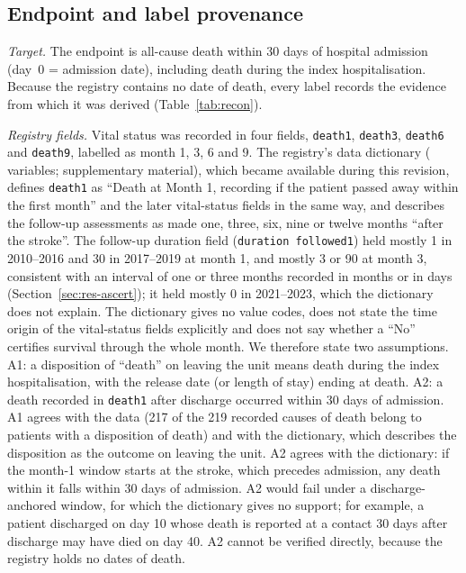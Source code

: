 \documentclass[preprint,10pt]{elsarticle}
\begin{document}
\subsection{Endpoint and label provenance}
\label{sec:outcome}
\emph{Target.} The endpoint is all-cause death within 30 days of hospital admission (day~0 = admission date), including death during the index hospitalisation. Because the registry contains no date of death, every label records the evidence from which it was derived (Table~\ref{tab:recon}).

\emph{Registry fields.} Vital status was recorded in four fields, \texttt{death1}, \texttt{death3}, \texttt{death6} and \texttt{death9}, labelled as month 1, 3, 6 and 9. The registry's data dictionary (\DictRows{} variables; supplementary material), which became available during this revision, defines \texttt{death1} as ``Death at Month 1, recording if the patient passed away within the first month'' and the later vital-status fields in the same way, and describes the follow-up assessments as made one, three, six, nine or twelve months ``after the stroke''. The follow-up duration field (\texttt{duration followed1}) held mostly 1 in 2010--2016 and 30 in 2017--2019 at month 1, and mostly 3 or 90 at month 3, consistent with an interval of one or three months recorded in months or in days (Section~\ref{sec:res-ascert}); it held mostly 0 in 2021--2023, which the dictionary does not explain. The dictionary gives no value codes, does not state the time origin of the vital-status fields explicitly and does not say whether a ``No'' certifies survival through the whole month. We therefore state two assumptions. A1: a disposition of ``death'' on leaving the unit means death during the index hospitalisation, with the release date (or length of stay) ending at death. A2: a death recorded in \texttt{death1} after discharge occurred within 30 days of admission. A1 agrees with the data (217 of the 219 recorded causes of death belong to patients with a disposition of death) and with the dictionary, which describes the disposition as the outcome on leaving the unit. A2 agrees with the dictionary: if the month-1 window starts at the stroke, which precedes admission, any death within it falls within 30 days of admission. A2 would fail under a discharge-anchored window, for which the dictionary gives no support; for example, a patient discharged on day 10 whose death is reported at a contact 30 days after discharge may have died on day 40. A2 cannot be verified directly, because the registry holds no dates of death.
\end{document}
